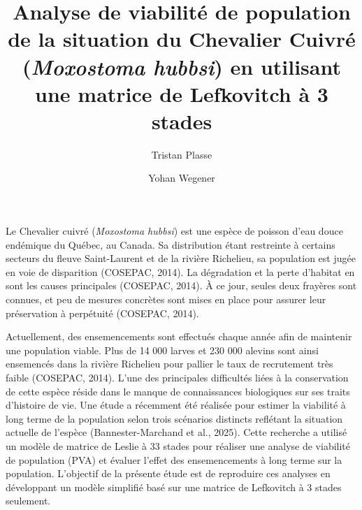 \documentclass[9pt,twocolumn,twoside,]{pnas-new}
\title{Analyse de viabilité de population de la situation du Chevalier
Cuivré (\emph{Moxostoma hubbsi}) en utilisant une matrice de Lefkovitch
à 3 stades}
\author[a]{Tristan Plasse}
\author[a]{Yohan Wegener}
\affil[a]{Université de Sherbrooke, Département de Biologie,
Sherbrooke, Québec, J1K 2R1}
\begin{document}
\verticaladjustment{-2pt}



\maketitle
\thispagestyle{firststyle}


\acknow{}

Le Chevalier cuivré (\emph{Moxostoma hubbsi}) est une espèce de poisson
d'eau douce endémique du Québec, au Canada. Sa distribution étant
restreinte à certains secteurs du fleuve Saint-Laurent et de la rivière
Richelieu, sa population est jugée en voie de disparition (COSEPAC,
2014). La dégradation et la perte d'habitat en sont les causes
principales (COSEPAC, 2014). À ce jour, seules deux frayères sont
connues, et peu de mesures concrètes sont mises en place pour assurer
leur préservation à perpétuité (COSEPAC, 2014).

Actuellement, des ensemencements sont effectués chaque année afin de
maintenir une population viable. Plus de 14 000 larves et 230 000
alevins sont ainsi ensemencés dans la rivière Richelieu pour pallier le
taux de recrutement très faible (COSEPAC, 2014). L'une des principales
difficultés liées à la conservation de cette espèce réside dans le
manque de connaissances biologiques sur ses traits d'histoire de vie.
Une étude a récemment été réalisée pour estimer la viabilité à long
terme de la population selon trois scénarios distincts reflétant la
situation actuelle de l'espèce (Bannester-Marchand et al., 2025). Cette
recherche a utilisé un modèle de matrice de Leslie à 33 stades pour
réaliser une analyse de viabilité de population (PVA) et évaluer l'effet
des ensemencements à long terme sur la population. L'objectif de la
présente étude est de reproduire ces analyses en développant un modèle
simplifié basé sur une matrice de Lefkovitch à 3 stades seulement.
\end{document}
